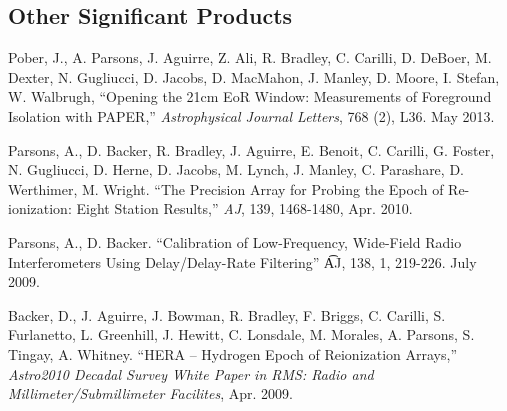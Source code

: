 \documentclass[apjpt4]{aastex}
\begin{document}
\subsection*{Other Significant Products}
\vspace{-8pt}

Pober, J., { A. Parsons}, J. Aguirre, Z. Ali, R. Bradley, C. Carilli, D. DeBoer, M. Dexter, N. Gugliucci, D. Jacobs, D. MacMahon, J. Manley, D. Moore, I. Stefan, W. Walbrugh,
``Opening the 21cm EoR Window: Measurements of Foreground Isolation with PAPER,''
{\it Astrophysical Journal Letters}, 768 (2), L36.  May 2013.


Parsons, A.,  D. Backer, R. Bradley, J. Aguirre, E. Benoit, C. Carilli, G. Foster, N. Gugliucci, D. Herne, D. Jacobs, M. Lynch, J. Manley, C. Parashare, D. Werthimer, M. Wright.
``The Precision Array for Probing the Epoch of Re-ionization: Eight Station Results,''
{\it AJ}, 139, 1468-1480, Apr. 2010.

Parsons, A., D. Backer.
``Calibration of Low-Frequency, Wide-Field Radio Interferometers Using Delay/Delay-Rate Filtering''
{\t AJ}, 138, 1, 219-226. July 2009.



Backer, D., J. Aguirre, J. Bowman, R. Bradley, F. Briggs,
C. Carilli, S. Furlanetto, L. Greenhill, J. Hewitt,
C. Lonsdale, M. Morales, A. Parsons, S. Tingay, A. Whitney.
``HERA – Hydrogen Epoch of Reionization Arrays,''
{\it Astro2010 Decadal Survey White Paper in RMS: Radio and Millimeter/Submillimeter Facilites}, Apr. 2009.
\end{document}

